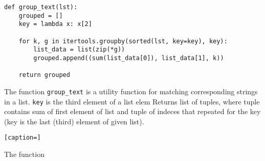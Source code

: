 \begin{lstlisting}[caption=group\_text]
def group_text(lst):
    grouped = []
    key = lambda x: x[2]

    for k, g in itertools.groupby(sorted(lst, key=key), key):
        list_data = list(zip(*g))
        grouped.append((sum(list_data[0]), list_data[1], k))

    return grouped
\end{lstlisting}

The function \lstinline{group_text} is a utility function for matching corresponding strings in a list. \lstinline{key} is the third element of a list elem
Returns list of tuples, where tuple contains sum of first element of list 
and tuple of indeces that repeated for the key (key is the last (third) 
element of given list). 


\begin{lstlisting}[caption=]

\end{lstlisting}

The function \lstinline{}